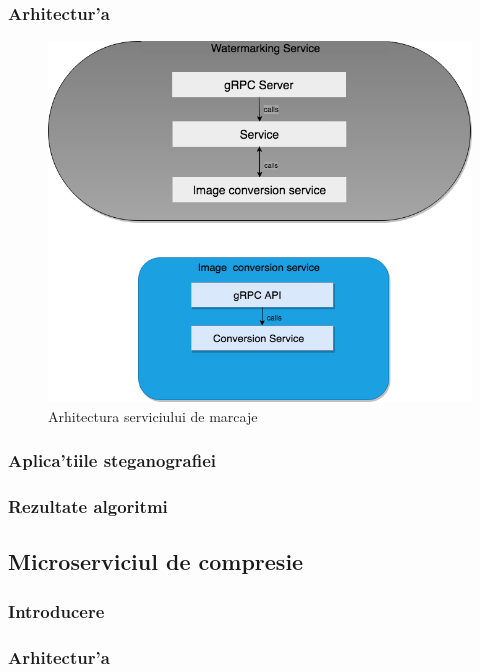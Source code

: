 \documentclass[12pt,a4paper,twoside]{report}
\begin{document}
\subsubsection{Arhitectur'a}

\begin{figure}[H]
\begin{center}
\advance\leftskip-3cm
\advance\rightskip-3cm
\includegraphics[keepaspectratio=true,scale=0.4]{img/watermarking_arch.png}
\caption{Arhitectura serviciului de marcaje}
\label{water_arch}
\end{center}
\end{figure}

\subsubsection{Aplica'tiile steganografiei}
\subsubsection{Rezultate algoritmi}


\subsection{Microserviciul de compresie} \label{s_compession}
\subsubsection{Introducere}
\subsubsection{Arhitectur'a}
\end{document}
